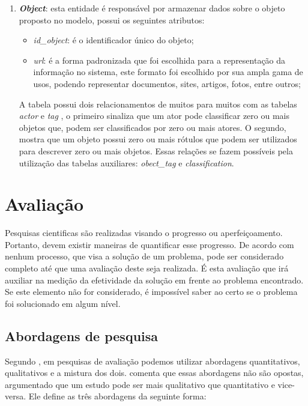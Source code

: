 \begin{enumerate}
    \item \textbf{\emph{Object}}: esta entidade é responsável por armazenar dados sobre o objeto proposto no modelo, possui os seguintes atributos:
    \begin{itemize}
        \item \emph{id\_object}: é o identificador único do objeto;  
        \item \emph{url}: é a forma padronizada que foi escolhida para a representação da informação no sistema, este formato foi escolhido por sua ampla gama de usos, podendo representar documentos, sites, artigos, fotos, entre outros;
    \end{itemize}
    A tabela possui dois relacionamentos de muitos para muitos com as tabelas \emph{actor} e \emph{tag} , o primeiro  sinaliza que um ator pode classificar zero ou mais objetos que, podem ser classificados por zero ou mais atores. O segundo, mostra que um objeto possui zero ou mais rótulos que podem ser utilizados para descrever zero ou mais objetos. Essas relações se fazem possíveis pela utilização das tabelas auxiliares: \emph{obect\_tag} e \emph{classification}.
\end{enumerate}    


\section{Avaliação}

Pesquisas cientificas são realizadas visando o progresso ou aperfeiçoamento. Portanto, devem existir maneiras de quantificar esse progresso. De acordo com \cite{jayaratna_understanding_1994} nenhum processo, que visa a solução de um problema, pode ser considerado completo até que uma avaliação deste seja realizada. É esta avaliação que irá auxiliar na medição da efetividade da solução em frente ao problema encontrado. Se este elemento não for considerado, é impossível saber ao certo se o problema foi solucionado em algum nível.

\subsection{Abordagens de pesquisa}

Segundo \cite{chen_s._information_2011}, em pesquisas de avaliação podemos utilizar abordagens quantitativos, qualitativos e a mistura dos dois. \cite{creswell_research_2014} comenta que essas abordagens não são opostas, argumentado que um estudo pode ser mais qualitativo que quantitativo e vice-versa. Ele define as três abordagens da seguinte forma:


